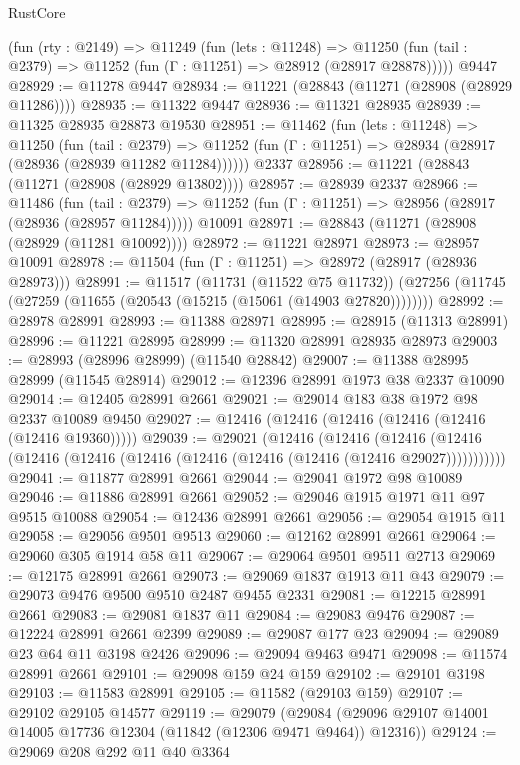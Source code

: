 \begin{lexlean}{RustCore}
\begin{coremodule}
    (fun (rty : @2149) =>
    @11249
      (fun (lets : @11248) =>
      @11250 (fun (tail : @2379) => @11252 (fun (Γ : @11251) => @28912 (@28917 @28878)))))
    @9447
@28929 := @11278 @9447
@28934 := @11221 (@28843 (@11271 (@28908 (@28929 @11286))))
@28935 := @11322 @9447
@28936 := @11321 @28935
@28939 := @11325 @28935 @28873 @19530
@28951 := @11462
    (fun (lets : @11248) =>
    @11250
      (fun (tail : @2379) =>
      @11252 (fun (Γ : @11251) => @28934 (@28917 (@28936 (@28939 @11282 @11284))))))
    @2337
@28956 := @11221 (@28843 (@11271 (@28908 (@28929 @13802))))
@28957 := @28939 @2337
@28966 := @11486
    (fun (tail : @2379) => @11252 (fun (Γ : @11251) => @28956 (@28917 (@28936 (@28957 @11284)))))
    @10091
@28971 := @28843 (@11271 (@28908 (@28929 (@11281 @10092))))
@28972 := @11221 @28971
@28973 := @28957 @10091
@28978 := @11504 (fun (Γ : @11251) => @28972 (@28917 (@28936 @28973)))
@28991 := @11517
    (@11731 (@11522 @75 @11732))
    (@27256 (@11745 (@27259 (@11655 (@20543 (@15215 (@15061 (@14903 @27820))))))))
@28992 := @28978 @28991
@28993 := @11388 @28971
@28995 := @28915 (@11313 @28991)
@28996 := @11221 @28995
@28999 := @11320 @28991 @28935 @28973
@29003 := @28993 (@28996 @28999) (@11540 @28842)
@29007 := @11388 @28995 @28999 (@11545 @28914)
@29012 := @12396 @28991 @1973 @38 @2337 @10090
@29014 := @12405 @28991 @2661
@29021 := @29014 @183 @38 @1972 @98 @2337 @10089 @9450
@29027 := @12416 (@12416 (@12416 (@12416 (@12416 (@12416 @19360)))))
@29039 := @29021
    (@12416
      (@12416
        (@12416 (@12416 (@12416 (@12416 (@12416 (@12416 (@12416 (@12416 (@12416 @29027)))))))))))
@29041 := @11877 @28991 @2661
@29044 := @29041 @1972 @98 @10089
@29046 := @11886 @28991 @2661
@29052 := @29046 @1915 @1971 @11 @97 @9515 @10088
@29054 := @12436 @28991 @2661
@29056 := @29054 @1915 @11
@29058 := @29056 @9501 @9513
@29060 := @12162 @28991 @2661
@29064 := @29060 @305 @1914 @58 @11
@29067 := @29064 @9501 @9511 @2713
@29069 := @12175 @28991 @2661
@29073 := @29069 @1837 @1913 @11 @43
@29079 := @29073 @9476 @9500 @9510 @2487 @9455 @2331
@29081 := @12215 @28991 @2661
@29083 := @29081 @1837 @11
@29084 := @29083 @9476
@29087 := @12224 @28991 @2661 @2399
@29089 := @29087 @177 @23
@29094 := @29089 @23 @64 @11 @3198 @2426
@29096 := @29094 @9463 @9471
@29098 := @11574 @28991 @2661
@29101 := @29098 @159 @24 @159
@29102 := @29101 @3198
@29103 := @11583 @28991
@29105 := @11582 (@29103 @159)
@29107 := @29102 @29105 @14577
@29119 := @29079
    (@29084 (@29096 @29107 @14001 @14005 @17736 @12304 (@11842 (@12306 @9471 @9464)) @12316))
@29124 := @29069 @208 @292 @11 @40 @3364

\end{coremodule}
\end{lexlean}
